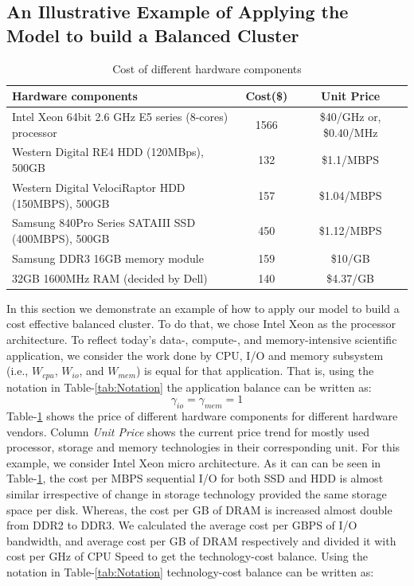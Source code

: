 \documentclass[journal]{IEEEtran}
\begin{document}
\subsection{An Illustrative Example of Applying the Model to build a Balanced Cluster}
\begin{table}[!t]
\caption{Cost of different hardware components}
\label{tab:Cost}
\centering
\begin{tabular}{|p{4cm}|c|c|}
\hline
Hardware components & Cost(\$) & Unit Price\\
\hline
Intel Xeon 64bit 2.6 GHz E5 series (8-cores) processor & 1566 & \$40/GHz or, \$0.40/MHz\\
\hline
Western Digital RE4 HDD (120MBps), 500GB & 132 & \$1.1/MBPS\\
\hline
Western Digital VelociRaptor HDD (150MBPS), 500GB & 157 & \$1.04/MBPS\\
\hline
Samsung 840Pro Series SATAIII SSD (400MBPS), 500GB & 450 & \$1.12/MBPS\\
\hline
Samsung DDR3 16GB memory module & 159 & \$10/GB\\
\hline
32GB 1600MHz RAM (decided by Dell) & 140 & \$4.37/GB\\
\hline
\end{tabular}
\end{table}
In this section we demonstrate an example of how to apply our model to build a cost effective balanced cluster. To do that, we chose Intel Xeon as the processor architecture. To reflect today's data-, compute-, and memory-intensive scientific application, we consider the work done by CPU, I/O and memory subsystem (i.e., $W_{cpu}$, $W_{io}$, and $W_{mem}$) is equal for that application. That is, using the notation in Table-\ref{tab:Notation} the application balance  can be written as:
\begin{equation} \label{eqn:PractAppBal}
\gamma_{io} = \gamma_{mem} = 1
\end{equation}
Table-\ref{tab:Cost} shows the price of different hardware components for different hardware vendors. Column \textit{Unit Price} shows the current price trend  for mostly used processor, storage and memory technologies in their corresponding unit. For this example, we consider Intel Xeon micro architecture. As it can can be seen in  Table-\ref{tab:Cost}, the cost per MBPS sequential I/O for both SSD and HDD is almost similar irrespective of change in storage technology provided the same storage space per disk. Whereas, the cost per GB of DRAM is increased almost double from DDR2 to DDR3. We calculated the average cost per GBPS of I/O bandwidth, and average cost per GB of DRAM respectively and divided it with cost per GHz of CPU Speed to get the technology-cost balance. Using the notation in Table-\ref{tab:Notation} technology-cost balance can be written as: 
\end{document}
